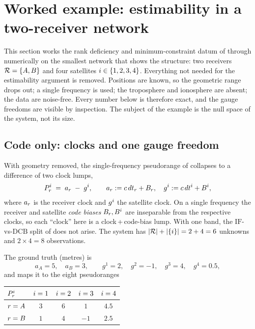 \documentclass[main.tex]{subfiles}
\begin{document}

\section{Worked example: estimability in a two-receiver network}
\label{sec:net-example}

This section works the rank deficiency and minimum-constraint datum of
through numerically on the smallest network that shows the structure: two
receivers $\mathcal{R} = \{A, B\}$ and four satellites $i \in \{1,2,3,4\}$.
Everything not needed for the estimability argument is removed. Positions
are known, so the geometric range drops out; a single frequency is used;
the troposphere and ionosphere are absent; the data are noise-free. Every
number below is therefore exact, and the gauge freedoms are visible by
inspection. The subject of the example is the null space of the system,
not its size.

\subsection{Code only: clocks and one gauge freedom}
\label{sec:net-example-code}

With geometry removed, the single-frequency pseudorange of
 collapses to a
difference of two clock lumps,
\begin{equation}
P^i_r \;=\; a_r \;-\; g^i,
\qquad
a_r := c\,dt_r + B_r,
\quad
g^i := c\,dt^i + B^i,
\label{eq:ex-code-model}
\end{equation}
where $a_r$ is the receiver clock and $g^i$ the satellite clock. On
a single frequency the receiver and satellite \emph{code biases}
$B_r, B^i$ are inseparable from the respective clocks, so each
``clock'' here is a clock\,+\,code-bias lump. With one band, the
$\mathrm{IF}$-vs-$\mathrm{DCB}$ split of
does not arise. The system has $|\mathcal{R}| + |\{i\}| = 2 + 4 = 6$
unknowns and $2 \times 4 = 8$ observations.

The ground truth (metres) is
\begin{equation*}
a_A = 5,\quad a_B = 3,\qquad
g^1 = 2,\quad g^2 = -1,\quad g^3 = 4,\quad g^4 = 0.5,
\end{equation*}
and  maps it to the eight pseudoranges
\begin{center}
\begin{tabular}{@{}lcccc@{}}
\toprule
$P^i_r$ & $i=1$ & $i=2$ & $i=3$ & $i=4$ \\
\midrule
$r = A$ & $3$ & $6$ & $1$ & $4.5$ \\
$r = B$ & $1$ & $4$ & $-1$ & $2.5$ \\
\bottomrule
\end{tabular}
\end{center}
\end{document}
